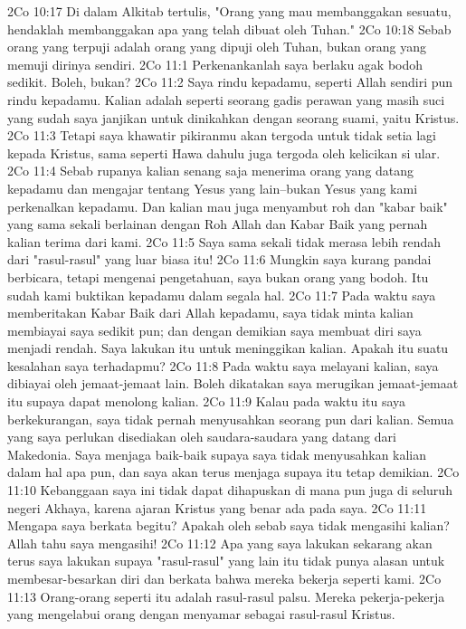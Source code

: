 2Co 10:17  Di dalam Alkitab tertulis, "Orang yang mau membanggakan sesuatu, hendaklah membanggakan apa yang telah dibuat oleh Tuhan."
2Co 10:18  Sebab orang yang terpuji adalah orang yang dipuji oleh Tuhan, bukan orang yang memuji dirinya sendiri.
2Co 11:1  Perkenankanlah saya berlaku agak bodoh sedikit. Boleh, bukan?
2Co 11:2  Saya rindu kepadamu, seperti Allah sendiri pun rindu kepadamu. Kalian adalah seperti seorang gadis perawan yang masih suci yang sudah saya janjikan untuk dinikahkan dengan seorang suami, yaitu Kristus.
2Co 11:3  Tetapi saya khawatir pikiranmu akan tergoda untuk tidak setia lagi kepada Kristus, sama seperti Hawa dahulu juga tergoda oleh kelicikan si ular.
2Co 11:4  Sebab rupanya kalian senang saja menerima orang yang datang kepadamu dan mengajar tentang Yesus yang lain--bukan Yesus yang kami perkenalkan kepadamu. Dan kalian mau juga menyambut roh dan "kabar baik" yang sama sekali berlainan dengan Roh Allah dan Kabar Baik yang pernah kalian terima dari kami.
2Co 11:5  Saya sama sekali tidak merasa lebih rendah dari "rasul-rasul" yang luar biasa itu!
2Co 11:6  Mungkin saya kurang pandai berbicara, tetapi mengenai pengetahuan, saya bukan orang yang bodoh. Itu sudah kami buktikan kepadamu dalam segala hal.
2Co 11:7  Pada waktu saya memberitakan Kabar Baik dari Allah kepadamu, saya tidak minta kalian membiayai saya sedikit pun; dan dengan demikian saya membuat diri saya menjadi rendah. Saya lakukan itu untuk meninggikan kalian. Apakah itu suatu kesalahan saya terhadapmu?
2Co 11:8  Pada waktu saya melayani kalian, saya dibiayai oleh jemaat-jemaat lain. Boleh dikatakan saya merugikan jemaat-jemaat itu supaya dapat menolong kalian.
2Co 11:9  Kalau pada waktu itu saya berkekurangan, saya tidak pernah menyusahkan seorang pun dari kalian. Semua yang saya perlukan disediakan oleh saudara-saudara yang datang dari Makedonia. Saya menjaga baik-baik supaya saya tidak menyusahkan kalian dalam hal apa pun, dan saya akan terus menjaga supaya itu tetap demikian.
2Co 11:10  Kebanggaan saya ini tidak dapat dihapuskan di mana pun juga di seluruh negeri Akhaya, karena ajaran Kristus yang benar ada pada saya.
2Co 11:11  Mengapa saya berkata begitu? Apakah oleh sebab saya tidak mengasihi kalian? Allah tahu saya mengasihi!
2Co 11:12  Apa yang saya lakukan sekarang akan terus saya lakukan supaya "rasul-rasul" yang lain itu tidak punya alasan untuk membesar-besarkan diri dan berkata bahwa mereka bekerja seperti kami.
2Co 11:13  Orang-orang seperti itu adalah rasul-rasul palsu. Mereka pekerja-pekerja yang mengelabui orang dengan menyamar sebagai rasul-rasul Kristus.
